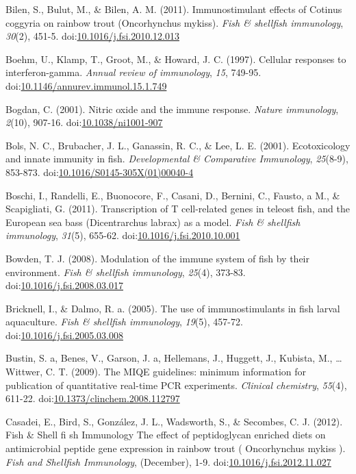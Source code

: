 \documentclass[12pt,letterpaper,oneside]{scrbook}
\begin{document}
Bilen, S., Bulut, M., \& Bilen, A. M. (2011). Immunostimulant effects of
Cotinus coggyria on rainbow trout (Oncorhynchus mykiss). \emph{Fish \&
shellfish immunology}, \emph{30}(2), 451-5.
doi:\href{http://dx.doi.org/10.1016/j.fsi.2010.12.013}{10.1016/j.fsi.2010.12.013}

Boehm, U., Klamp, T., Groot, M., \& Howard, J. C. (1997). Cellular
responses to interferon-gamma. \emph{Annual review of immunology},
\emph{15}, 749-95.
doi:\href{http://dx.doi.org/10.1146/annurev.immunol.15.1.749}{10.1146/annurev.immunol.15.1.749}

Bogdan, C. (2001). Nitric oxide and the immune response. \emph{Nature
immunology}, \emph{2}(10), 907-16.
doi:\href{http://dx.doi.org/10.1038/ni1001-907}{10.1038/ni1001-907}

Bols, N. C., Brubacher, J. L., Ganassin, R. C., \& Lee, L. E. (2001).
Ecotoxicology and innate immunity in fish. \emph{Developmental \&
Comparative Immunology}, \emph{25}(8-9), 853-873.
doi:\href{http://dx.doi.org/10.1016/S0145-305X(01)00040-4}{10.1016/S0145-305X(01)00040-4}

Boschi, I., Randelli, E., Buonocore, F., Casani, D., Bernini, C.,
Fausto, a M., \& Scapigliati, G. (2011). Transcription of T cell-related
genes in teleost fish, and the European sea bass (Dicentrarchus labrax)
as a model. \emph{Fish \& shellfish immunology}, \emph{31}(5), 655-62.
doi:\href{http://dx.doi.org/10.1016/j.fsi.2010.10.001}{10.1016/j.fsi.2010.10.001}

Bowden, T. J. (2008). Modulation of the immune system of fish by their
environment. \emph{Fish \& shellfish immunology}, \emph{25}(4), 373-83.
doi:\href{http://dx.doi.org/10.1016/j.fsi.2008.03.017}{10.1016/j.fsi.2008.03.017}

Bricknell, I., \& Dalmo, R. a. (2005). The use of immunostimulants in
fish larval aquaculture. \emph{Fish \& shellfish immunology},
\emph{19}(5), 457-72.
doi:\href{http://dx.doi.org/10.1016/j.fsi.2005.03.008}{10.1016/j.fsi.2005.03.008}

Bustin, S. a, Benes, V., Garson, J. a, Hellemans, J., Huggett, J.,
Kubista, M., \ldots{} Wittwer, C. T. (2009). The MIQE guidelines:
minimum information for publication of quantitative real-time PCR
experiments. \emph{Clinical chemistry}, \emph{55}(4), 611-22.
doi:\href{http://dx.doi.org/10.1373/clinchem.2008.112797}{10.1373/clinchem.2008.112797}

Casadei, E., Bird, S., González, J. L., Wadsworth, S., \& Secombes, C.
J. (2012). Fish \& Shell fi sh Immunology The effect of peptidoglycan
enriched diets on antimicrobial peptide gene expression in rainbow trout
( Oncorhynchus mykiss ). \emph{Fish and Shellfish Immunology},
(December), 1-9.
doi:\href{http://dx.doi.org/10.1016/j.fsi.2012.11.027}{10.1016/j.fsi.2012.11.027}
\end{document}

